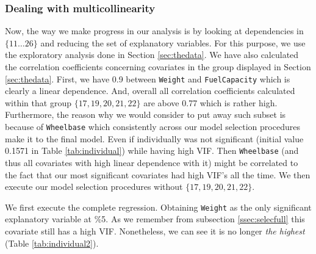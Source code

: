 \documentclass[12pt]{article}
\begin{document}
\subsubsection{Dealing with multicollinearity}\label{ssec:selecwo}
Now, the way we make progress in our analysis is by looking at dependencies in $\{11\ldots26\}$ and
reducing the set of explanatory variables. For this purpose, we use the exploratory analysis done in Section \ref{sec:thedata}.
We have also calculated the correlation coefficients concerning covariates in the group displayed in Section \ref{sec:thedata}. First, we have 0.9 between \texttt{Weight} and \texttt{FuelCapacity} which
is clearly a linear dependence.
And, overall all correlation coefficients calculated within that group $\{17,19,20,21,22\}$ are above
0.77 which is rather high. Furthermore, the reason why we would consider to put away such subset is
because of \texttt{Wheelbase} which consistently across our model selection procedures make it to the final model. Even if individually was not significant (initial value 0.1571 in Table \ref{tab:individual})
while having high VIF. Then \texttt{Wheelbase} (and thus all covariates with high linear dependence with it) might be correlated to the fact that our most significant covariates had high VIF's all the time.
We then execute our model selection procedures without $\{17,19,20,21,22\}$.

We first execute the complete regression. Obtaining \texttt{Weight} as the only significant
explanatory variable at \%5. As we remember from subsection \ref{ssec:selecfull} this covariate
still has a high VIF. Nonetheless, we can see it is no longer \emph{the highest} (Table \ref{tab:individual2}).
\end{document}
